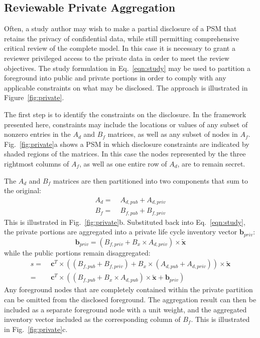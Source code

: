 \subsection{Reviewable Private Aggregation}



Often, a study author may wish to make a partial disclosure of a PSM that retains the privacy of confidential data, while still permitting comprehensive critical review of the complete model.  In this case it is necessary to grant a reviewer privileged access to the private data in order to meet the review objectives.  The study formulation in Eq.~\ref{eqn:study} may be used to partition a foreground into public and private portions in order to comply with any applicable constraints on what may be disclosed.  The approach is illustrated in Figure~\ref{fig:private}.

The first step is to identify the constraints on the disclosure.  In the framework presented here, constraints may include the locations or values of any subset of nonzero entries in the $A_d$ and $B_f$ matrices, as well as any subset of nodes in $A_f$.  Fig.~\ref{fig:private}a shows a PSM in which disclosure constraints are indicated by shaded regions of the matrices.  In this case the nodes represented by the three rightmost columns of $A_f$, as well as one entire row of $A_d$, are to remain secret.  

The $A_d$ and $B_f$ matrices are then partitioned into two components that sum to the original:
\begin{equation}\begin{aligned}
  A_d =\; & A_{d,pub} + A_{d,priv} \\
  B_f =\; & B_{f,pub} + B_{f,priv}
  \label{eqn:partition}
  \end{aligned}
  \end{equation}
This is illustrated in Fig.~\ref{fig:private}b.  Substituted back into Eq.~\ref{eqn:study}, the private portions are aggregated into a private life cycle inventory vector $\mathbf{b}_{priv}$:
\begin{equation}
  \mathbf{b}_{priv} = (B_{f,priv} + B_x\times A_{d,priv})\times \tilde{\mathbf{x}}
  \label{eqn:bpriv}
\end{equation}
while the public portions remain disaggregated:
\begin{align}
  s =\; & \mathbf{c}^T\times\left((B_{f,pub} + B_{f,priv}) + B_x\times (A_{d,pub} + A_{d,priv})\right)\times\tilde{\mathbf{x}}\\
  =\; & \mathbf{c}^T\times\left((B_{f,pub} + B_x\times A_{d,pub})\times\tilde{\mathbf{x}} + \mathbf{b}_{priv}\right)\label{eqn:private}
\end{align}
Any foreground nodes that are completely contained within the private partition can be omitted from the disclosed foreground.  The aggregation result can then be included as a separate foreground node with a unit weight, and the aggregated inventory vector included as the corresponding column of $B_f$.  This is illustrated in Fig.~\ref{fig:private}c.


